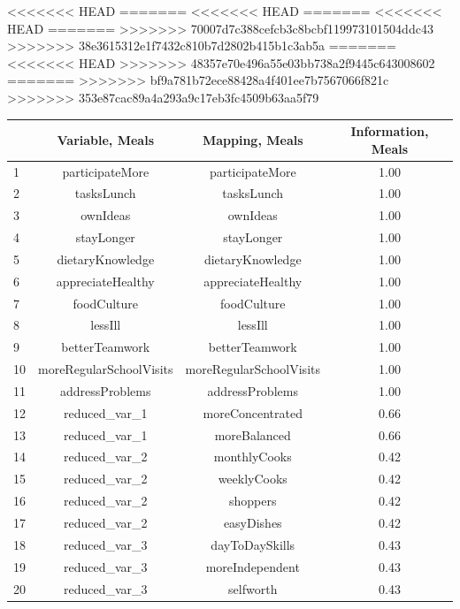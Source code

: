 \documentclass[12pt, a4paper, titlepage]{article}\usepackage[]{graphicx}\usepackage[]{color}
\begin{document}
<<<<<<< HEAD
=======
<<<<<<< HEAD
=======
<<<<<<< HEAD
=======
>>>>>>> 70007d7c388cefcb3c8bcbf119973101504ddc43
>>>>>>> 38e3615312e1f7432c810b7d2802b415b1c3ab5a
=======
<<<<<<< HEAD
>>>>>>> 48357e70e496a55e03bb738a2f9445c643008602
=======
>>>>>>> bf9a781b72ece88428a4f401ee7b7567066f821c
>>>>>>> 353e87cac89a4a293a9c17eb3fc4509b63aa5f79
\begin{table}[ht]
\centering
\begin{tabular}{lccc}
  \hline
 & Variable, Meals & Mapping, Meals & Information, Meals \\ 
  \hline
1 & participateMore & participateMore & 1.00 \\ 
  2 & tasksLunch & tasksLunch & 1.00 \\ 
  3 & ownIdeas & ownIdeas & 1.00 \\ 
  4 & stayLonger & stayLonger & 1.00 \\ 
  5 & dietaryKnowledge & dietaryKnowledge & 1.00 \\ 
  6 & appreciateHealthy & appreciateHealthy & 1.00 \\ 
  7 & foodCulture & foodCulture & 1.00 \\ 
  8 & lessIll & lessIll & 1.00 \\ 
  9 & betterTeamwork & betterTeamwork & 1.00 \\ 
  10 & moreRegularSchoolVisits & moreRegularSchoolVisits & 1.00 \\ 
  11 & addressProblems & addressProblems & 1.00 \\ 
  12 & reduced\_var\_1 & moreConcentrated & 0.66 \\ 
  13 & reduced\_var\_1 & moreBalanced & 0.66 \\ 
  14 & reduced\_var\_2 & monthlyCooks & 0.42 \\ 
  15 & reduced\_var\_2 & weeklyCooks & 0.42 \\ 
  16 & reduced\_var\_2 & shoppers & 0.42 \\ 
  17 & reduced\_var\_2 & easyDishes & 0.42 \\ 
  18 & reduced\_var\_3 & dayToDaySkills & 0.43 \\ 
  19 & reduced\_var\_3 & moreIndependent & 0.43 \\ 
  20 & reduced\_var\_3 & selfworth & 0.43 \\ 

\end{tabular}
\end{table}
\end{document}
